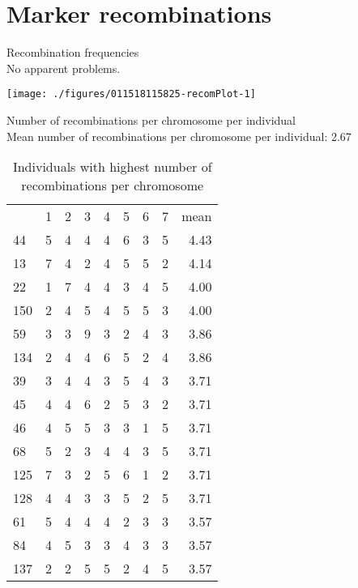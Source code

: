 \documentclass[a4paper,11pt]{article}\usepackage[]{graphicx}\usepackage[]{color}
\makeatletter
\def\maxwidth{ %
  \ifdim\Gin@nat@width>\linewidth
    \linewidth
  \else
    \Gin@nat@width
  \fi
}
\newenvironment{knitrout}{}{} %
\makeatother
\begin{document}
\newpage
\section{Marker recombinations}
Recombination frequencies\\
No apparent problems.

\begin{knitrout}
\color{fgcolor}
\texttt{[image: ./figures/011518115825-recomPlot-1]} 

\end{knitrout}
\newpage
Number of recombinations per chromosome per individual\\


Mean number of recombinations per chromosome per individual: 2.67%
\begin{table}[ht]
\begin{flushleft}
\caption{Individuals with highest number of
                     recombinations per chromosome} 
\label{recInd}
\begin{tabular}{lrrrrrrrr}
  & 1 & 2 & 3 & 4 & 5 & 6 & 7 & mean \\ 
 44 & 5 & 4 & 4 & 4 & 6 & 3 & 5 & 4.43 \\ 
  13 & 7 & 4 & 2 & 4 & 5 & 5 & 2 & 4.14 \\ 
  22 & 1 & 7 & 4 & 4 & 3 & 4 & 5 & 4.00 \\ 
  150 & 2 & 4 & 5 & 4 & 5 & 5 & 3 & 4.00 \\ 
  59 & 3 & 3 & 9 & 3 & 2 & 4 & 3 & 3.86 \\ 
  134 & 2 & 4 & 4 & 6 & 5 & 2 & 4 & 3.86 \\ 
  39 & 3 & 4 & 4 & 3 & 5 & 4 & 3 & 3.71 \\ 
  45 & 4 & 4 & 6 & 2 & 5 & 3 & 2 & 3.71 \\ 
  46 & 4 & 5 & 5 & 3 & 3 & 1 & 5 & 3.71 \\ 
  68 & 5 & 2 & 3 & 4 & 4 & 3 & 5 & 3.71 \\ 
  125 & 7 & 3 & 2 & 5 & 6 & 1 & 2 & 3.71 \\ 
  128 & 4 & 4 & 3 & 3 & 5 & 2 & 5 & 3.71 \\ 
  61 & 5 & 4 & 4 & 4 & 2 & 3 & 3 & 3.57 \\ 
  84 & 4 & 5 & 3 & 3 & 4 & 3 & 3 & 3.57 \\ 
  137 & 2 & 2 & 5 & 5 & 2 & 4 & 5 & 3.57 \\ 
  \end{tabular}
\end{flushleft}
\end{table}

\end{document}
